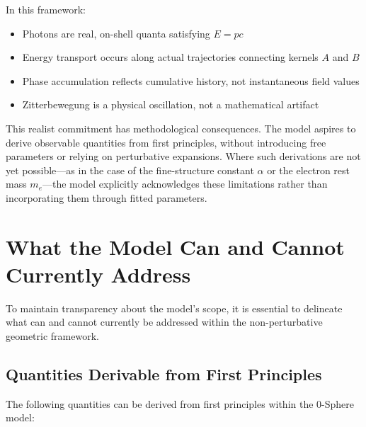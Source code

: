 \documentclass[12pt,letterpaper]{article}
\begin{document}
In this framework:
\begin{itemize}
\item Photons are real, on-shell quanta satisfying $E = pc$
\item Energy transport occurs along actual trajectories connecting kernels $A$ and $B$
\item Phase accumulation reflects cumulative history, not instantaneous field values
\item Zitterbewegung is a physical oscillation, not a mathematical artifact
\end{itemize}

This realist commitment has methodological consequences. The model aspires to derive observable quantities from first principles, without introducing free parameters or relying on perturbative expansions. Where such derivations are not yet possible—as in the case of the fine-structure constant $\alpha$ or the electron rest mass $m_e$—the model explicitly acknowledges these limitations rather than incorporating them through fitted parameters.


\section{What the Model Can and Cannot Currently Address}
\label{sec:scope}

To maintain transparency about the model's scope, it is essential to delineate what can and cannot currently be addressed within the non-perturbative geometric framework.

\subsection{Quantities Derivable from First Principles}
The following quantities can be derived from first principles within the 0-Sphere model:
\end{document}
